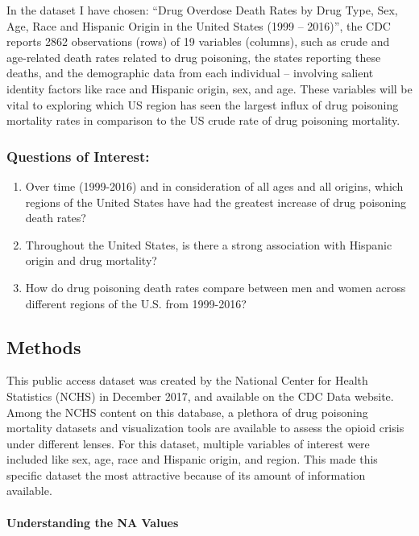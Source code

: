 \documentclass[
]{article}
\begin{document}
In the dataset I have chosen: ``Drug Overdose Death Rates by Drug Type,
Sex, Age, Race and Hispanic Origin in the United States (1999 --
2016)'', the CDC reports 2862 observations (rows) of 19 variables
(columns), such as crude and age-related death rates related to drug
poisoning, the states reporting these deaths, and the demographic data
from each individual -- involving salient identity factors like race and
Hispanic origin, sex, and age. These variables will be vital to
exploring which US region has seen the largest influx of drug poisoning
mortality rates in comparison to the US crude rate of drug poisoning
mortality.

\subsubsection{Questions of Interest:}\label{questions-of-interest}

\begin{enumerate}
\def\labelenumi{\arabic{enumi}.}
\item
  Over time (1999-2016) and in consideration of all ages and all
  origins, which regions of the United States have had the greatest
  increase of drug poisoning death rates?
\item
  Throughout the United States, is there a strong association with
  Hispanic origin and drug mortality?
\item
  How do drug poisoning death rates compare between men and women across
  different regions of the U.S. from 1999-2016?
\end{enumerate}

\subsection{Methods}\label{methods}

This public access dataset was created by the National Center for Health
Statistics (NCHS) in December 2017, and available on the CDC Data
website. Among the NCHS content on this database, a plethora of drug
poisoning mortality datasets and visualization tools are available to
assess the opioid crisis under different lenses. For this dataset,
multiple variables of interest were included like sex, age, race and
Hispanic origin, and region. This made this specific dataset the most
attractive because of its amount of information available.

\paragraph{Understanding the NA
Values}\label{understanding-the-na-values}
\end{document}

